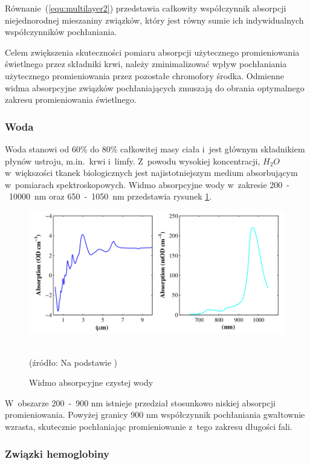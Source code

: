 Równanie~(\ref{equ:multilayer2}) przedstawia całkowity współczynnik absorpcji niejednorodnej mieszaniny związków, który jest równy sumie ich indywidualnych 
współczynników pochłaniania.

Celem zwiększenia skuteczności pomiaru absorpcji użytecznego promieniowania świetlnego przez składniki krwi, należy zminimalizować wpływ pochłaniania użytecznego
promieniowania przez pozostałe chromofory środka. Odmienne widma absorpcyjne związków pochłaniających zmuszają do obrania optymalnego zakresu promieniowania
świetlnego.

\subsubsection{Woda}
\label{subsubsec:Woda}

Woda stanowi od 60\% do 80\% całkowitej masy ciała i~jest głównym składnikiem płynów ustroju, m.in.~krwi i~limfy. Z~powodu wysokiej koncentracji, $H_{2}O$ 
w~większości tkanek biologicznych jest najistotniejszym medium absorbującym w~pomiarach spektroskopowych. Widmo absorpcyjne wody w~zakresie 200~-~10000~nm 
oraz 650~-~1050~nm przedstawia rysunek \ref{rys:water}.

\begin{figure}[ht]
\centerline{\includegraphics[scale = 0.56]{graphic/water.png}}
	\caption{Widmo absorpcyjne czystej wody}
	\label{rys:water}
	~\\
	(źródło: Na podstawie \cite{Haggblad:2008})
\end{figure}
\noindent W~obszarze 200~-~900 nm istnieje przedział stosunkowo niskiej absorpcji promieniowania. Powyżej granicy 900 nm współczynnik pochłaniania gwałtownie 
wzrasta, skutecznie pochłaniając promieniowanie z~tego zakresu długości fali.

\subsubsection{Związki hemoglobiny}
\label{subsubsec:hemoglobina}

